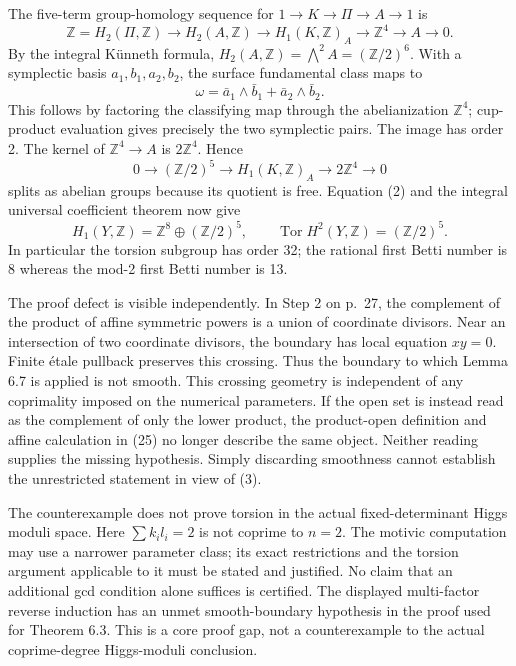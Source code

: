 \documentclass[10pt]{article}
\begin{document}
The five-term group-homology sequence for \(1\to K\to\Pi\to A\to1\) is \[\mathbb Z=H_2(\Pi,\mathbb Z)\longrightarrow H_2(A,\mathbb Z)
 \longrightarrow H_1(K,\mathbb Z)_A\longrightarrow\mathbb Z^4
 \longrightarrow A\longrightarrow0.\] By the integral Künneth formula, \(H_2(A,\mathbb Z)=\bigwedge^2 A=(\mathbb Z/2)^6\). With a symplectic basis \(a_1,b_1,a_2,b_2\), the surface fundamental class maps to \[\omega=\bar a_1\wedge\bar b_1+\bar a_2\wedge\bar b_2.\] This follows by factoring the classifying map through the abelianization \(\mathbb Z^4\); cup-product evaluation gives precisely the two symplectic pairs. The image has order 2. The kernel of \(\mathbb Z^4\to A\) is \(2\mathbb Z^4\). Hence \[0\longrightarrow(\mathbb Z/2)^5\longrightarrow H_1(K,\mathbb Z)_A
 \longrightarrow2\mathbb Z^4\longrightarrow0\] splits as abelian groups because its quotient is free. Equation (2) and the integral universal coefficient theorem now give \[H_1(Y,\mathbb Z)=\mathbb Z^8\oplus(\mathbb Z/2)^5,\qquad
 \boxed{\operatorname{Tor}H^2(Y,\mathbb Z)=(\mathbb Z/2)^5.}                        \tag{3}\] In particular the torsion subgroup has order 32; the rational first Betti number is 8 whereas the mod-2 first Betti number is 13.\par
The proof defect is visible independently. In Step 2 on p. 27, the complement of the product of affine symmetric powers is a union of coordinate divisors. Near an intersection of two coordinate divisors, the boundary has local equation \(xy=0\). Finite étale pullback preserves this crossing. Thus the boundary to which Lemma 6.7 is applied is not smooth. This crossing geometry is independent of any coprimality imposed on the numerical parameters. If the open set is instead read as the complement of only the lower product, the product-open definition and affine calculation in (25) no longer describe the same object. Neither reading supplies the missing hypothesis. Simply discarding smoothness cannot establish the unrestricted statement in view of (3).\par
The counterexample does not prove torsion in the actual fixed-determinant Higgs moduli space. Here \(\sum k_i l_i=2\) is not coprime to \(n=2\). The motivic computation may use a narrower parameter class; its exact restrictions and the torsion argument applicable to it must be stated and justified. No claim that an additional gcd condition alone suffices is certified. The displayed multi-factor reverse induction has an unmet smooth-boundary hypothesis in the proof used for Theorem 6.3. This is a core proof gap, not a counterexample to the actual coprime-degree Higgs-moduli conclusion.\par
\end{document}

